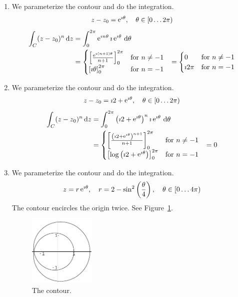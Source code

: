{\begin{Solution}
  \label{solution integrate z-z0 n}
  \begin{enumerate}
  \item 
    We parameterize the contour and do the integration.
    \[
    z - z_0 = \mathop{\mathrm{e}}\nolimits^{\imath \theta}, \quad \theta \in [0 \ldots 2 \pi)
    \]
    \begin{align*}
      \int_C (z - z_0)^n \,\mathrm{d} z
      &= \int_0^{2 \pi} \mathop{\mathrm{e}}\nolimits^{\imath n \theta}  \imath \mathop{\mathrm{e}}\nolimits^{\imath \theta} \,\mathrm{d} \theta
      \\
      &= \begin{cases}
        \left[ \frac{ \mathop{\mathrm{e}}\nolimits^{\imath (n + 1) \theta} }{ n + 1 } \right]_0^{2 \pi} &\mathrm{for}\ n \neq -1
        \\
        \left[ \imath \theta \right]_0^{2 \pi} &\mathrm{for}\ n = -1
      \end{cases}
      &= \begin{cases}
        0 &\mathrm{for}\ n \neq -1
        \\
        \imath 2 \pi &\mathrm{for}\ n = -1
      \end{cases}
    \end{align*}
  \item 
    We parameterize the contour and do the integration.
    \[
    z - z_0 = \imath 2 + \mathop{\mathrm{e}}\nolimits^{\imath \theta}, \quad \theta \in [0 \ldots 2 \pi)
    \]
    \begin{align*}
      \int_C (z - z_0)^n \,\mathrm{d} z
      &= \int_0^{2 \pi} \left( \imath 2 + \mathop{\mathrm{e}}\nolimits^{\imath \theta} \right)^n  \imath \mathop{\mathrm{e}}\nolimits^{\imath \theta} \,\mathrm{d} \theta
      \\
      &= \begin{cases}
        \left[ \frac{ \left( \imath 2 + \mathop{\mathrm{e}}\nolimits^{\imath \theta} \right)^{n+1} }{ n + 1 } \right]_0^{2 \pi} 
        &\mathrm{for}\ n \neq -1
        \\
        \left[ \log \left( \imath 2 + \mathop{\mathrm{e}}\nolimits^{\imath \theta} \right) \right]_0^{2 \pi} 
        &\mathrm{for}\ n = -1
      \end{cases}
      &= 0
    \end{align*}
  \item 
    We parameterize the contour and do the integration.
    \[
    z = r \mathop{\mathrm{e}}\nolimits^{\imath \theta}, \quad 
    r = 2 - \sin^2 \left( \frac{\theta}{4} \right), \quad 
    \theta \in [0 \ldots 4 \pi)
    \]
    The contour encircles the origin twice.  See Figure~\ref{figure 2sin2q4}.
    \begin{figure}[htb!]
      \begin{center}
        \includegraphics[width=0.3\textwidth]{fcv/integration/2sin2q4}
      \end{center}
      \caption{The contour.}
      \label{figure 2sin2q4}
    \end{figure}


\end{enumerate}
\end{Solution}}
